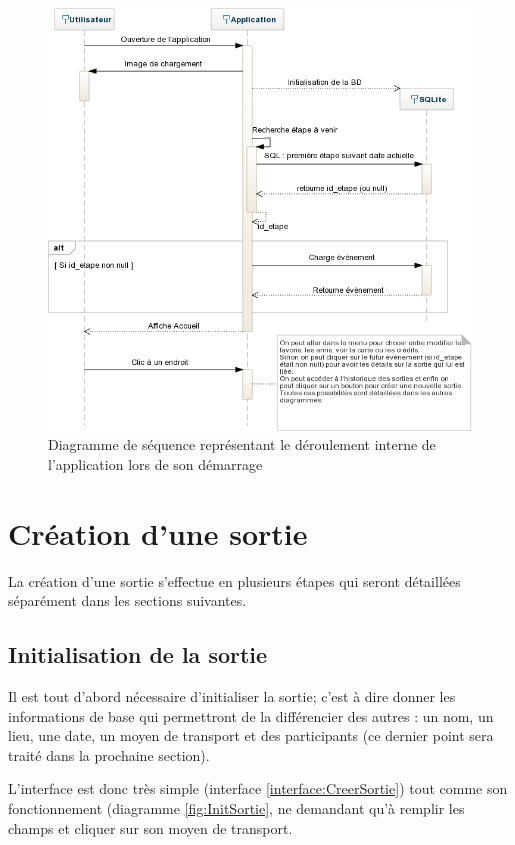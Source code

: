 \documentclass[a4paper, 12pt, notitlepage]{article} %
\begin{document}
\begin{figure}[!htb]
    \centering
    \includegraphics[width=1\textwidth]{Sequence_Accueil.png}
    \caption[Diagramme de séquence de l'accueil]{Diagramme de séquence représentant le déroulement interne de l'application lors de son démarrage}
    \label{fig:Accueil}
\end{figure}
\clearpage


\section{Création d'une sortie}
La création d'une sortie s'effectue en plusieurs étapes qui seront détaillées séparément dans les sections suivantes.

\subsection{Initialisation de la sortie}
Il est tout d’abord nécessaire d'initialiser la sortie; c'est à dire donner les informations de base qui permettront de la différencier des autres : un nom, un lieu, une date, un moyen de transport et des participants (ce dernier point sera traité dans la prochaine section).

L'interface est donc très simple (interface \ref{interface:CreerSortie}) tout comme son fonctionnement (diagramme \ref{fig:InitSortie}, ne demandant qu'à remplir les champs et cliquer sur son moyen de transport.
\end{document}
